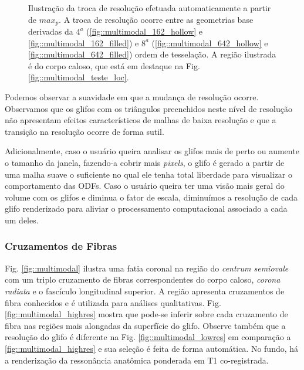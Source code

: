 \documentclass[
    12pt,                %
    oneside,            %
    a4paper,            %
    english,            %
    french,                %
    spanish,            %
    brazil                %
    ]{abntex2}
\begin{document}
\begin{figure}[ht]
{    \label{fig::multimodal_642_hollow}
    }
    \caption{Ilustração da troca de resolução efetuada automaticamente a partir de $max_p$. A troca de resolução ocorre entre as geometrias base derivadas da $4^a$ (\ref{fig::multimodal_162_hollow} e \ref{fig::multimodal_162_filled}) e $8^a$ (\ref{fig::multimodal_642_hollow} e \ref{fig::multimodal_642_filled}) ordem de tesselação. A região ilustrada é do corpo caloso, que está em destaque na Fig. \ref{fig::multimodal_teste_loc}.
    }
    \label{fig::multimodal_teste_zoom}
\end{figure}

Podemos observar a suavidade em que a mudança de resolução ocorre. Observamos que os glifos com os triângulos preenchidos neste nível de resolução não apresentam efeitos característicos de malhas de baixa resolução e que a transição na resolução ocorre de forma sutil.

Adicionalmente, caso o usuário queira analisar os glifos mais de perto ou aumente o tamanho da janela, fazendo-a cobrir mais \textit{pixels}, o glifo é gerado a partir de uma malha suave o suficiente no qual ele tenha total liberdade para visualizar o comportamento das ODFs. Caso o usuário queira ter uma visão mais geral do volume com os glifos e diminua o fator de escala, diminuímos a resolução de cada glifo renderizado para aliviar o processamento computacional associado a cada um deles.


\subsubsection{Cruzamentos de Fibras}

Fig. \ref{fig::multimodal} ilustra uma fatia coronal na região do \textit{centrum semiovale} com um triplo cruzamento de fibras correspondentes do corpo caloso, \textit{corona radiata} e o fascículo longitudinal superior. A região apresenta cruzamentos de fibra conhecidos e é utilizada para análises qualitativas. Fig. \ref{fig::multimodal_highres} mostra que pode-se inferir sobre cada cruzamento de fibra nas regiões mais alongadas da superfície do glifo. Observe também que a resolução do glifo é diferente na Fig. \ref{fig::multimodal_lowres} em comparação a \ref{fig::multimodal_highres} e sua seleção é feita de forma automática. No fundo, há a renderização da ressonância anatômica ponderada em T1 co-registrada.
\end{document}
